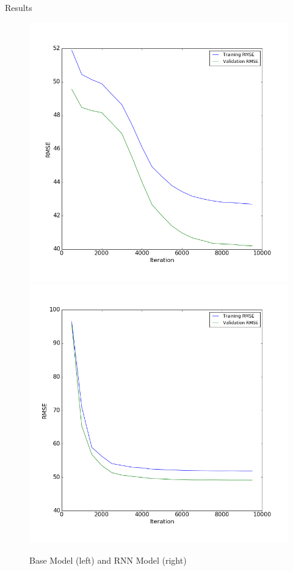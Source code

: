 \documentclass[10pt]{beamer}
\begin{document}
\begin{frame}{Results}
\begin{figure}
\includegraphics[scale=0.2]{../images/base_loss.png}
\includegraphics[scale=0.2]{../images/rnn_loss.png}
\caption{Base Model (left) and RNN Model (right)}
\end{figure}
\end{frame}
\end{document}
